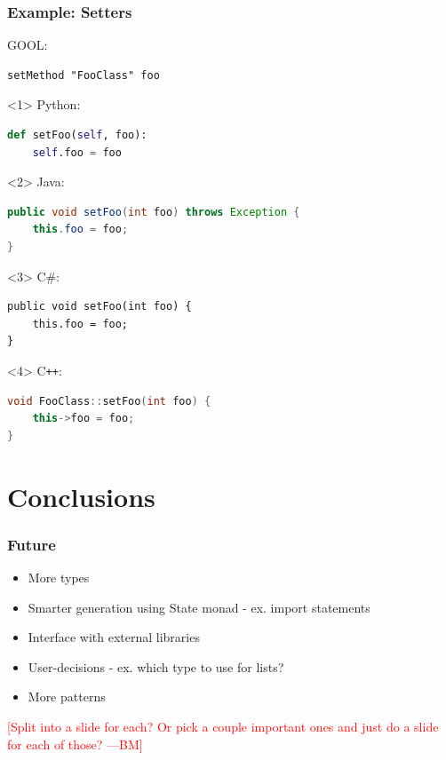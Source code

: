 \documentclass{beamer}
\newcommand{\authornote}[3]{\textcolor{#1}{[#3 ---#2]}}
\newcommand{\bmac}[1]{\authornote{red}{BM}{#1}}
\newcommand{\Csharp}{C\#}
\newcommand{\Cplusplus}{C\texttt{++}}
\begin{document}
\begin{frame}[fragile]

\frametitle{Example: Setters}

GOOL:
\begin{lstlisting}
setMethod "FooClass" foo
\end{lstlisting}
\vspace{\baselineskip}

\begin{onlyenv}<1>
Python:
\begin{lstlisting}[language=Python]
def setFoo(self, foo):
    self.foo = foo
\end{lstlisting}
\end{onlyenv}

\begin{onlyenv}<2>
Java:
\begin{lstlisting}[language=java]
public void setFoo(int foo) throws Exception {
    this.foo = foo;
}
\end{lstlisting}
\end{onlyenv}

\begin{onlyenv}<3>
\Csharp:
\lstset{language=[Sharp]C}
\begin{lstlisting}
public void setFoo(int foo) {
    this.foo = foo;
}
\end{lstlisting}
\lstset{language=haskell}
\end{onlyenv}

\begin{onlyenv}<4>
\Cplusplus:
\begin{lstlisting}[language=C++]
void FooClass::setFoo(int foo) {
    this->foo = foo;
}
\end{lstlisting}
\end{onlyenv}

\end{frame}


\section[Conclusions]{Conclusions}


\begin{frame}

\frametitle{Future}

\begin{itemize}
  \item More types
  \item Smarter generation using State monad - ex. import statements
  \item Interface with external libraries
  \item User-decisions - ex. which type to use for lists?
  \item More patterns
\end{itemize}

\bmac{Split into a slide for each? Or pick a couple important ones and just do 
a slide for each of those?}

\end{frame}
\end{document}
